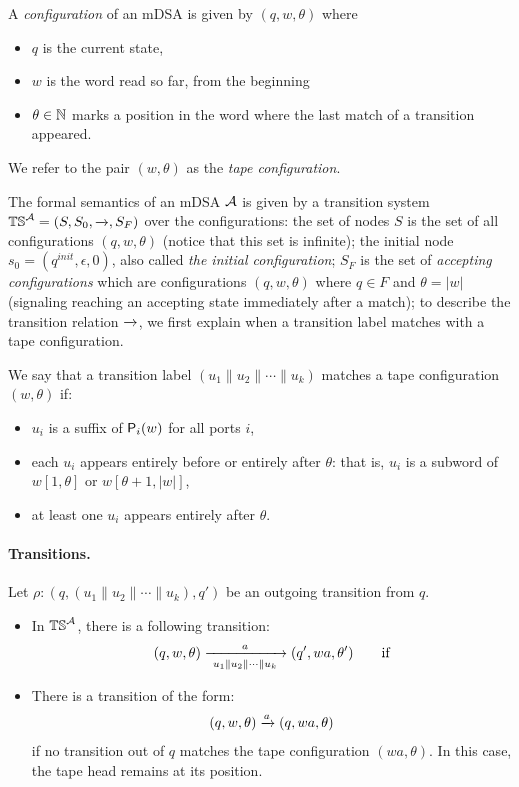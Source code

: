   A \emph{configuration} of an mDSA is given by $(q, w, \theta)$ where
  \begin{itemize}
  \item $q$ is the current state,
  \item $w$ is the word read so far, from the beginning
  \item $\theta \in \mathbb{N}$ marks a position in the word where the last match of a transition appeared.  
  \end{itemize} 
  We refer to the pair $(w, \theta)$ as the \emph{tape configuration}.
  
  The formal semantics of an mDSA $\mathcal{A}$ is given by a transition system $\mathbb{TS}^{\mathcal{A}} = (S, S_0, \xrightarrow{}, S_F)$  over the configurations: the set of nodes $S$ is  the set of all configurations $(q, w, \theta)$ (notice that this set is infinite); the initial node $s_0 = (q^{init}, \epsilon, 0)$, also called \emph{the initial configuration}; $S_F$  is the set of \emph{accepting configurations} which are configurations $(q, w, \theta)$ where $q \in F$ and $\theta = |w|$ (signaling reaching an accepting state immediately after a match); to describe the transition relation $\xrightarrow{}$, we first explain when a transition label matches with a tape configuration. 

  \begin{definition}
    We say that a transition label $(u_1 \parallel u_2 \parallel \cdots \parallel u_k)$ matches a tape configuration $(w, \theta)$ if:
    \begin{itemize}
      \item $u_i$ is a suffix of $\mathsf{P}_{i}(w)$ for all ports $i$,
      \item each $u_i$ appears entirely before or entirely after $\theta$: that is, $u_i$ is a subword of $w[1, \theta]$ or $w[\theta+1, |w|]$,
      \item at least one $u_i$ appears entirely after $\theta$.
    \end{itemize}
  \end{definition}

\paragraph*{Transitions.} Let $\rho: (q, (u_1 \parallel u_2 \parallel \cdots \parallel u_k), q')$ be an outgoing transition from $q$. 
\begin{itemize}
\item In $\mathbb{TS}^{\mathcal{A}}$, there is a following transition:
\begin{align*}
 (q, w, \theta) \xrightarrow[~u_1 \parallel u_2 \parallel \cdots \parallel u_k~]{a} (q', wa, \theta') \qquad \text{if}
\end{align*}

\item There is a transition of the form:
\begin{align*}
  (q, w, \theta) \xrightarrow{a} (q, wa, \theta)
\end{align*}
if no transition out of $q$ matches the tape configuration $(wa, \theta)$. In this case, the tape head remains at its position.
\end{itemize} 

